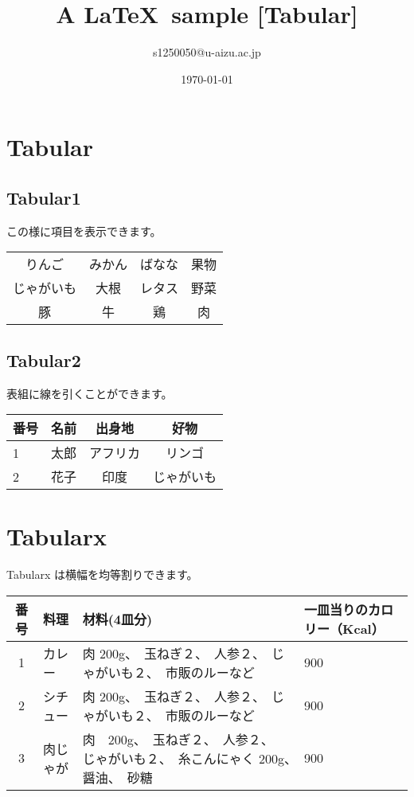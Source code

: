 \documentclass[a4paper]{jarticle}
\title{A \LaTeX ~sample [Tabular]}
\author{s1250050@u-aizu.ac.jp}
\date{\today}
\begin{document}
\maketitle
\section{Tabular}
\subsection{Tabular1}
この様に項目を表示できます。 \\
\begin{center}
\begin{tabular}{c c c || c}
りんご & みかん & ばなな & 果物 \\
じゃがいも & 大根 & レタス & 野菜 \\
豚 & 牛 & 鶏 & 肉 \\
\end{tabular}
\end{center}

\subsection{Tabular2}
表組に線を引くことができます。
\begin{tabular}{| l | r |  c | c |}
\hline
番号 & 名前 & 出身地 & 好物 \\
\hline
\hline
1 & 太郎 & アフリカ & リンゴ \\
\hline
2 & 花子 & 印度 & じゃがいも \\
\hline
\end{tabular}

\section{Tabularx}
Tabularx は横幅を均等割りできます。 \\
\begin{tabularx}{45zw}{| c || X |  X | X |}
\hline
番号 & 料理 & 材料(4皿分) & 一皿当りのカロリー（Kcal）\\
\hline
\hline
1 & カレー & 肉 200g、　玉ねぎ２、　人参２、　じゃがいも２、　市販のルーなど & 900 \\
\hline
2 & シチュー& 肉 200g、　玉ねぎ２、　人参２、　じゃがいも２、　市販のルーなど & 900 \\
\hline
3 & 肉じゃが & 肉　200g、　玉ねぎ２、　人参２、　じゃがいも２、　糸こんにゃく 200g、　醤油、　砂糖 & 900 \\
\hline
\end{tabularx}
\end{document}

